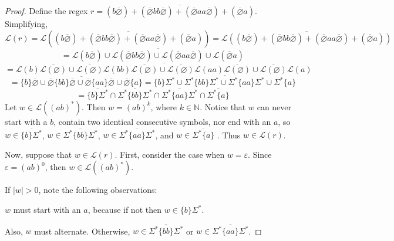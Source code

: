 \documentclass[11pt]{article}
\begin{document}
\begin{enumerate}[label=\textbf{Q\arabic*.}]
\begin{enumerate}[label=\textit{\alph*)}]
	\begin{proof}
		Define the regex \(r = \overline{(b\overline{\varnothing}) + (\overline{\varnothing}bb\overline{\varnothing}) + (\overline{\varnothing}aa\overline{\varnothing}) + (\overline{\varnothing}a)}\). Simplifying,
		\[
			\mathcal{L} (r) = \mathcal{L} \left(\overline{(b\overline{\varnothing}) + (\overline{\varnothing}bb\overline{\varnothing}) + (\overline{\varnothing}aa\overline{\varnothing}) + (\overline{\varnothing}a)}\right) = \overline{\mathcal{L}((b\overline{\varnothing}) + (\overline{\varnothing}bb\overline{\varnothing}) + (\overline{\varnothing}aa\overline{\varnothing}) + (\overline{\varnothing}a))}
		\]
		\[
			= \overline{\mathcal{L} (b\overline{\varnothing}) \cup \mathcal{L} (\overline{\varnothing}bb\overline{\varnothing}) \cup \mathcal{L} (\overline{\varnothing}aa\overline{\varnothing}) \cup \mathcal{L} (\overline{\varnothing}a)}
		\]
		\[
			= \overline{\mathcal{L} (b) \overline{\mathcal{L} (\varnothing)} \cup \overline{\mathcal{L} (\varnothing)} \mathcal{L} (bb) \overline{\mathcal{L} (\varnothing)} \cup \overline{\mathcal{L} (\varnothing)} \mathcal{L} (aa) \overline{\mathcal{L} (\varnothing)} \cup \overline{\mathcal{L} (\varnothing)}\mathcal{L} (a)}
		\]
		\[
			= \overline{\{b\} \overline{\varnothing} \cup \overline{\varnothing} \{bb\} \overline{\varnothing} \cup \overline{\varnothing} \{aa\} \overline{\varnothing} \cup \overline{\varnothing}\{a\}} = \overline{\{b\} \Sigma ^* \cup \Sigma ^* \{bb\} \Sigma ^* \cup \Sigma ^* \{aa\} \Sigma ^* \cup \Sigma ^* \{a\}}
		\]
		\[
			= \overline{\{b\}\Sigma ^*} \cap \overline{\Sigma ^* \{bb\}\Sigma ^*} \cap \overline{\Sigma ^* \{aa\} \Sigma ^*} \cap \overline{\Sigma ^* \{a\}}
		\]
		Let \(w \in \mathcal{L}((ab)^*)\). Then \(w = (ab)^k\), where \(k \in \mathbb{N}\). Notice that \(w\) can never start with a \(b\), contain two identical consecutive symbols, nor end with an \(a\), so \(w \in \overline{\{b\}\Sigma ^*}\), \(w \in \overline{\Sigma ^* \{bb\}\Sigma ^*}\), \(w \in \overline{\Sigma ^* \{aa\} \Sigma ^*}\), and \(w \in \overline{\Sigma ^* \{a\}}\) . Thus \(w \in \mathcal{L} (r)\).

		Now, suppose that \(w \in \mathcal{L} (r)\). First, consider the case when \(w = \varepsilon\). Since \(\varepsilon = (ab)^0\), then \(w \in \mathcal{L} ((ab)^*)\).
		
		If \(|w| > 0\), note the following observations:

		\(w\) must start with an \(a\), because if not then \(w \in \{b\}\Sigma ^*\).

		Also, \(w\) must alternate. Otherwise, \(w \in \overline{\Sigma ^* \{bb\}\Sigma ^*}\) or \(w \in \overline{\Sigma ^* \{aa\} \Sigma ^*}\).


\end{proof}
\end{enumerate}
\end{enumerate}
\end{document}
